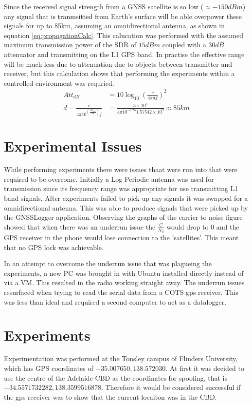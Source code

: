 Since the received signal strength from a GNSS satellite is so low ($\approx -150dBm$) any signal that is tranmsitted from Earth's surface will be able overpower these
signals for up to 85km, assuming an omnidirectional antenna, as shown in equation \ref{eq:propogationCalc}. This calucation was performed with the assumed maximum
transmission power of the SDR of $15 dBm$ coupled with a $30dB$ attenuator and transmitting on the L1 GPS band. In practise the effective range will be much less due to
attenuation due to objects between transmitter and receiver, but this calculation shows that performing the experiments within a controlled environment was requried.
\begin{equation}    
    \begin{split} \label{eq:propogationCalc}
        Att_{dB} &= 10 \log_{10}\left(\frac{c}{4\pi df}\right)^2 \\
        d = \frac{c}{4\pi 10^{\left(\frac{Att_{dB}}{20}\right)}f} &= \frac{3\times10^8}{4\pi 10^{-6.75}1.57542\times 10^9} \approx 85km
    \end{split}
\end{equation}

\section{Experimental Issues}
While performing experiments there were issues thaat were run into that were required to be overcome. Initially a Log Periodic antenna was used for transmission since its
frequency range was appropriate for use transmitting L1 band signals. After experiments failed to pick up any signals it was swapped for a omnidirectional antenna. This
was able to produce signals that were picked up by the GNSSLogger application. Observing the graphs of the carrier to noise figure showed that when there was an underrun
issue the $\frac{C}{N_0}$ would drop to 0 and the GPS receiver in the phone would lose connection to the 'satellites'. This meant that no GPS lock was achievable.  

In an attempt to overcome the underrun issue that was plagueing the experiments, a new PC was brought in with Ubuntu installed directly instead of via a VM. This resulted
in the radio working straight away. The underrun issues resurfaced when trying to read the serial data from a COTS gps receiver. This was less than ideal and required a
second computer to act as a datalogger.

\section{Experiments}
Experimentation was performed at the Tonsley campus of Flinders University, which has GPS coordinates of $-35.007650, 138.572030$. At first it was decided to use the
centre of the Adelaide CBD as the coordinates for spoofing, that is $-34.5571732282, 138.3599516878$. Therefore it would be considered successful if the gps receiver was to show
that the current locaiton was in the CBD.

